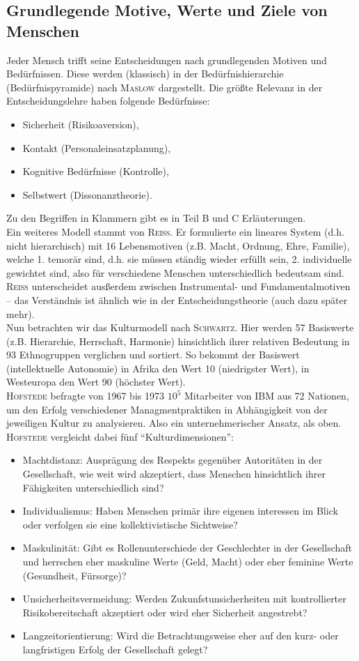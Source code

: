 \subsection{Grundlegende Motive, Werte und Ziele von Menschen}
Jeder Mensch trifft seine Entscheidungen nach grundlegenden Motiven und Bedürfnissen. Diese werden (klassisch) in der Bedürfnishierarchie (Bedürfnispyramide) nach \textsc{Maslow} dargestellt. Die größte Relevanz in der Entscheidungslehre haben folgende Bedürfnisse:
\begin{itemize}
	\item Sicherheit (Risikoaversion),
	\item Kontakt (Personaleinsatzplanung),
	\item Kognitive Bedürfnisse (Kontrolle),
	\item Selbstwert (Dissonanztheorie).
\end{itemize}
Zu den Begriffen in Klammern gibt es in Teil B und C Erläuterungen.\\
Ein weiteres Modell stammt von \textsc{Reiss}. Er formulierte ein lineares System (d.h. nicht hierarchisch) mit 16 Lebensmotiven (z.B. Macht, Ordnung, Ehre, Familie), welche 1. temorär sind, d.h. sie müssen ständig wieder erfüllt sein, 2. individuelle gewichtet sind, also für verschiedene Menschen unterschiedlich bedeutsam sind. \textsc{Reiss} unterscheidet ausßerdem zwischen Instrumental- und Fundamentalmotiven -- das Verständnis ist ähnlich wie in der Entscheidungstheorie (auch dazu später mehr).\\
Nun betrachten wir das Kulturmodell nach \textsc{Schwartz}. Hier werden 57 Basiswerte (z.B. Hierarchie, Herrschaft, Harmonie) hinsichtlich ihrer relativen Bedeutung in 93 Ethnogruppen verglichen und sortiert. So bekommt der Basiswert (intellektuelle Autonomie) in Afrika den Wert 10 (niedrigster Wert), in Westeuropa den Wert 90 (höchster Wert).\\
\textsc{Hofstede} befragte von 1967 bis 1973 \(10^5\) Mitarbeiter von IBM aus 72 Nationen, um den Erfolg verschiedener Managmentpraktiken in Abhängigkeit von der jeweiligen Kultur zu analysieren. Also ein unternehmerischer Ansatz, als oben. \textsc{Hofstede} vergleicht dabei fünf ``Kulturdimensionen'':
\begin{itemize}
	\item Machtdistanz: Ausprägung des Respekts gegenüber Autoritäten in der Gesellschaft, wie weit wird akzeptiert, dass Menschen hinsichtlich ihrer Fähigkeiten unterschiedlich sind?
	\item Individualismus: Haben Menschen primär ihre eigenen interessen im Blick oder verfolgen sie eine kollektivistische Sichtweise?
	\item Maskulinität: Gibt es Rollenunterschiede der Geschlechter in der Gesellschaft und herrschen eher maskuline Werte (Geld, Macht) oder eher feminine Werte (Gesundheit, Fürsorge)?
	\item Unsicherheitsvermeidung: Werden Zukunfstunsicherheiten mit kontrollierter Risikobereitschaft akzeptiert oder wird eher Sicherheit angestrebt?
	\item Langzeitorientierung: Wird die Betrachtungsweise eher auf den kurz- oder langfristigen Erfolg der Gesellschaft gelegt?
\end{itemize}
